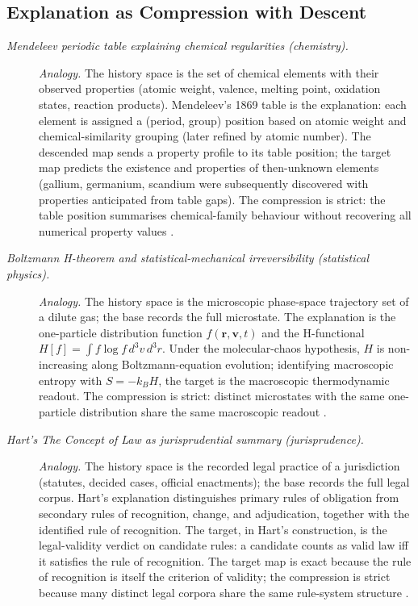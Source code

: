 \subsection*{ Explanation as Compression with Descent}
\begingroup\small
\begin{description}
\item[\emph{Mendeleev periodic table explaining
chemical regularities (chemistry).}] \textit{Analogy.}
The history space is the set of chemical elements
with their observed properties (atomic weight,
valence, melting point, oxidation states, reaction
products).  Mendeleev's 1869 table is the
explanation: each element is assigned a
(period, group) position based on atomic weight and
chemical-similarity grouping (later refined by atomic
number).  The descended map sends a property profile
to its table position; the target map predicts the
existence and properties of then-unknown elements
(gallium, germanium, scandium were subsequently
discovered with properties anticipated from table
gaps).  The compression is strict: the table position
summarises chemical-family behaviour without
recovering all numerical property values
\citep{Mendeleev1869Periodic}.

\item[\emph{Boltzmann {H}-theorem and
statistical-mechanical irreversibility (statistical
physics).}] \textit{Analogy.}
The history space is the microscopic phase-space
trajectory set of a dilute gas; the base records the
full microstate.  The explanation is the one-particle
distribution function \(f(\mathbf r,\mathbf v,t)\) and
the H-functional
\(H[f]=\int f\log f\,d^3v\,d^3r\).  Under the
molecular-chaos hypothesis, \(H\) is non-increasing
along Boltzmann-equation evolution; identifying
macroscopic entropy with \(S=-k_B H\), the target is
the macroscopic thermodynamic readout.  The
compression is strict: distinct microstates with the
same one-particle distribution share the same
macroscopic readout \citep{Boltzmann1872Weitere}.

\item[\emph{Hart's \emph{The Concept of Law} as
jurisprudential summary (jurisprudence).}] \textit{Analogy.}
The history space is the recorded legal practice of a
jurisdiction (statutes, decided cases, official
enactments); the base records the full legal corpus.
Hart's explanation distinguishes primary rules of
obligation from secondary rules of recognition,
change, and adjudication, together with the
identified rule of recognition.  The target, in
Hart's construction, is the legal-validity verdict on
candidate rules: a candidate counts as valid law iff
it satisfies the rule of recognition.  The target map
is exact because the rule of recognition is itself
the criterion of validity; the compression is strict
because many distinct legal corpora share the same
rule-system structure \citep{Hart1961Concept}.
\end{description}
\endgroup

